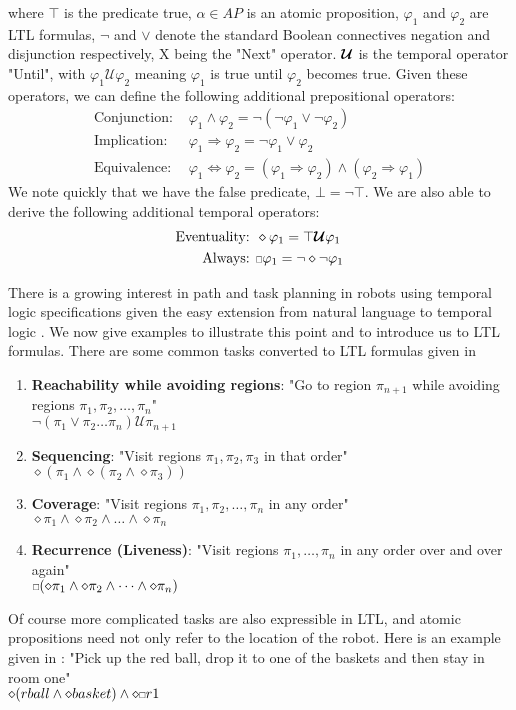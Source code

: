 where $\top$ is the predicate true, $\alpha \in AP$ is an atomic proposition, $\varphi_1$ and $\varphi_2$ are LTL formulas, $\neg$ and $\lor$ denote the standard Boolean connectives negation and disjunction respectively, X being the "Next" operator. $\bm{\mathcal{U}}$ is the temporal operator "Until", with $\varphi_1 \mathcal{U} \varphi_2$ meaning $\varphi_1$ is true until $\varphi_2$ becomes true. Given these operators, we can define the following additional prepositional operators:
\begin{align*}
    \text{Conjunction: }&  \varphi_1  \land \varphi_2 = \neg(\neg \varphi_1 \lor \neg \varphi_2) \\
    \text{Implication: }& \varphi_1 \Rightarrow \varphi_2 = \neg \varphi_1 \lor \varphi_2 \\
    \text{Equivalence: }& \varphi_1 \Leftrightarrow \varphi_2 = (\varphi_1 \Rightarrow \varphi_2) \land (\varphi_2 \Rightarrow \varphi_1)
\end{align*}
We note quickly that we have the false predicate, $\bot = \neg \top$.
We are also able to derive the following additional temporal operators:
\begin{align*}
    \text{Eventuality: }& \diamond \varphi_1 = \top \U \varphi_1 \\
    \text{Always: }& \ssquare \varphi_1 = \neg \diamond \neg \varphi_1
\end{align*}

There is a growing interest in path and task planning in robots using temporal logic specifications given the easy extension from natural language to temporal logic \cite{kress07}. We now give examples to illustrate this point and to introduce us to LTL formulas. There are some common tasks converted to LTL formulas given in \cite{fainekos09} 
\begin{enumerate}
    \item \textbf{Reachability while avoiding regions}: "Go to region $\pi_{n+1}$ while avoiding regions $\pi_1, \pi_2, \dots, \pi_n$" \\ $\neg(\pi_1 \lor \pi_2 \dots \pi_n) \mathcal{U} \pi_{n+1}$ 
    \item \textbf{Sequencing}: "Visit regions $\pi_1, \pi_2, \pi_3$ in that order"\\ 
    $\diamond (\pi_1 \land \diamond(\pi_2 \land \diamond \pi_3))$ 
    \item \textbf{Coverage}: "Visit regions $\pi_1, \pi_2, \dots, \pi_n$ in any order"\\ $\diamond \pi_1 \land \diamond \pi_2 \land \dots \land \diamond \pi_n$
    \item \textbf{Recurrence (Liveness)}: "Visit regions $\pi_1, \dots, \pi_n$ in any order over and over again"\\ $\ssquare(\diamond \pi_1 \land \diamond \pi_2 \land \dots \land \diamond \pi_n)$      
\end{enumerate}
Of course more complicated tasks are also expressible in LTL, and atomic propositions need not only refer to the location of the robot. Here is an example given in  \cite{guo15}: "Pick up the red ball, drop it to one of the baskets and then stay in room one" \\
$\diamond(rball \land \diamond basket) \land \diamond \ssquare r1$ 

